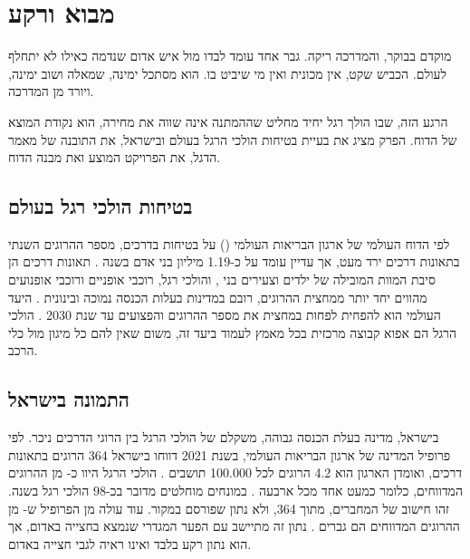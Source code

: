 \chapter{מבוא ורקע}
\begin{scenebox}
מוקדם בבוקר, והמדרכה ריקה. גבר אחד עומד לבדו מול איש אדום שנדמה כאילו לא יתחלף לעולם.
הכביש שקט, אין מכונית ואין מי שיביט בו. הוא מסתכל ימינה, שמאלה ושוב ימינה,
ויורד מן המדרכה.
\end{scenebox}

הרגע הזה, שבו הולך רגל יחיד מחליט שההמתנה אינה שווה את מחירה, הוא נקודת המוצא של הדוח.
הפרק מציג את בעיית בטיחות הולכי הרגל בעולם ובישראל, את התובנה של מאמר הדגל, את הפרויקט המוצע ואת מבנה הדוח.

\section{בטיחות הולכי רגל בעולם}
לפי הדוח העולמי של ארגון הבריאות העולמי () על בטיחות בדרכים, מספר ההרוגים השנתי בתאונות דרכים ירד מעט, אך עדיין עומד על כ-\num{1.19} מיליון בני אדם בשנה \cite{who2023}.
תאונות דרכים הן סיבת המוות המובילה של ילדים וצעירים בני , והולכי רגל, רוכבי אופניים ורוכבי אופנועים מהווים יחד יותר ממחצית ההרוגים, רובם במדינות בעלות הכנסה נמוכה ובינונית \cite{who2023}.
היעד העולמי הוא להפחית לפחות במחצית את מספר ההרוגים והפצועים עד שנת \num{2030} \cite{who2023}.
הולכי הרגל הם אפוא קבוצה מרכזית בכל מאמץ לעמוד ביעד זה, משום שאין להם כל מיגון מול כלי הרכב.

\section{התמונה בישראל}
בישראל, מדינה בעלת הכנסה גבוהה, משקלם של הולכי הרגל בין הרוגי הדרכים ניכר.
לפי פרופיל המדינה של ארגון הבריאות העולמי, בשנת \num{2021} דווחו בישראל \num{364} הרוגים בתאונות דרכים, ואומדן הארגון הוא \num{4.2} הרוגים לכל \num{100,000} תושבים \cite{who2023israel}.
הולכי הרגל היוו כ- מן ההרוגים המדווחים, כלומר כמעט אחד מכל ארבעה \cite{who2023israel}.
במונחים מוחלטים מדובר בכ-\num{98} הולכי רגל בשנה. זהו חישוב של המחברים,  מתוך \num{364}, ולא נתון שפורסם במקור.
עוד עולה מן הפרופיל ש- מן ההרוגים המדווחים הם גברים \cite{who2023israel}. נתון זה מתיישב עם הפער המגדרי שנמצא בחצייה באדום, אך הוא נתון רקע בלבד ואינו ראיה לגבי חצייה באדום.

